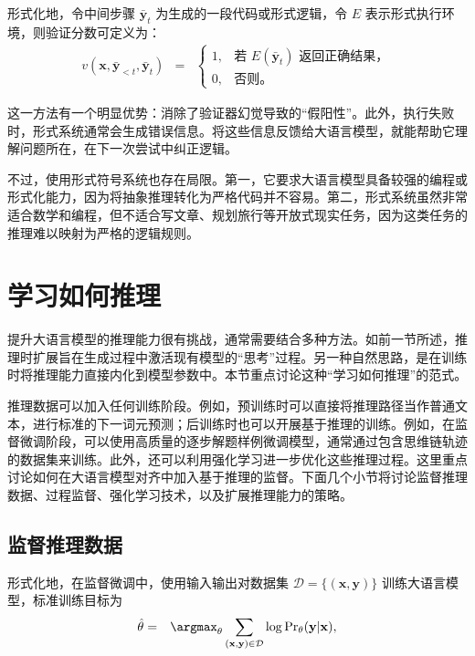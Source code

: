 形式化地，令中间步骤 $\bar{\mathbf{y}}_t$ 为生成的一段代码或形式逻辑，令 $E$ 表示形式执行环境，则验证分数可定义为：
\begin{eqnarray}
v(\mathbf{x}, \bar{\mathbf{y}}_{<t}, \bar{\mathbf{y}}_t) & = & \begin{cases}
1, & \text{若 } E(\bar{\mathbf{y}}_t) \text{ 返回正确结果，} \\
0, & \text{否则。}
\end{cases}
\end{eqnarray}


这一方法有一个明显优势：消除了验证器幻觉导致的“假阳性”。此外，执行失败时，形式系统通常会生成错误信息。将这些信息反馈给大语言模型，就能帮助它理解问题所在，在下一次尝试中纠正逻辑。

不过，使用形式符号系统也存在局限。第一，它要求大语言模型具备较强的编程或形式化能力，因为将抽象推理转化为严格代码并不容易。第二，形式系统虽然非常适合数学和编程，但不适合写文章、规划旅行等开放式现实任务，因为这类任务的推理难以映射为严格的逻辑规则。


\section{学习如何推理}

提升大语言模型的推理能力很有挑战，通常需要结合多种方法。如前一节所述，推理时扩展旨在生成过程中激活现有模型的“思考”过程。另一种自然思路，是在训练时将推理能力直接内化到模型参数中。本节重点讨论这种“学习如何推理”的范式。

推理数据可以加入任何训练阶段。例如，预训练时可以直接将推理路径当作普通文本，进行标准的下一词元预测；后训练时也可以开展基于推理的训练。例如，在监督微调阶段，可以使用高质量的逐步解题样例微调模型，通常通过包含思维链轨迹的数据集来训练。此外，还可以利用强化学习进一步优化这些推理过程。这里重点讨论如何在大语言模型对齐中加入基于推理的监督。下面几个小节将讨论监督推理数据、过程监督、强化学习技术，以及扩展推理能力的策略。

\subsection{监督推理数据}

形式化地，在监督微调中，使用输入输出对数据集 $\mathcal{D} = \{(\mathbf{x}, \mathbf{y})\}$ 训练大语言模型，标准训练目标为
\begin{eqnarray}
\hat{\theta} & = & \argmax_{\theta} \sum_{(\mathbf{x}, \mathbf{y}) \in \mathcal{D}} \log \mathrm{Pr}_{\theta} (\mathbf{y}|\mathbf{x}),
\end{eqnarray}

